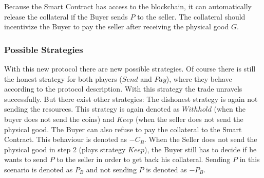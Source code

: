 \documentclass{cacthesis}
\begin{document}
Because the Smart Contract has access to the blockchain, it can automatically release the collateral if the Buyer sends $P$  to the seller. The collateral should incentivize the Buyer to pay the seller after receiving the physical good $G$.

\subsubsection{Possible Strategies}
With this new protocol there are new possible strategies. Of course there is still the honest strategy for both players ($Send$ and $Pay$), where they behave according to the protocol description. With this strategy the trade unravels successfully.\newline
But there exist other strategies: The dishonest strategy is again not sending the resources. This strategy is again denoted as $Withhold$ (when the buyer does not send the coins) and $Keep$ (when the seller does not send the physical good.\newline
The Buyer can also refuse to pay the collateral to the Smart Contract. This behaviour is denoted as $-C_B$.\newline
When the Seller does not send the physical good in step 2 (plays strategy $Keep$), the Buyer still has to decide if he wants to send $P$ to the seller in order to get back his collateral. Sending $P$ in this scenario is denoted as $P_B$ and not sending $P$ is denoted as $-P_B$.\newline
\end{document}
